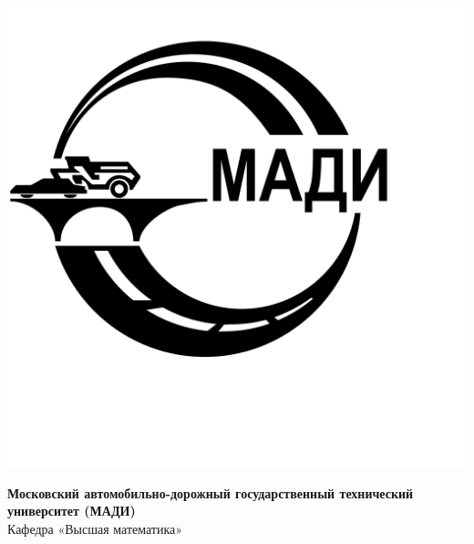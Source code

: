 \documentclass[a4paper,12pt]{article}
\begin{document}
\thispagestyle{empty} %
\titleformat{\section}[block]{\bfseries\large\filcenter}{\thesection}{1em}{}
\titleformat{\subsection}[block]{\bfseries\normalsize}{\thesubsection}{1em}{}
\titleformat{\subsubsection}[block]{\normalsize}{\thesubsubsection}{1em}{}


\noindent
\begin{minipage}{0.15\textwidth}
\includegraphics[width=\linewidth]{madi_logo.png}
\end{minipage}
\hfill
\begin{minipage}{0.85\textwidth}
\begin{center}
\textbf{Московский автомобильно-дорожный государственный технический университет (МАДИ)}\\
Кафедра «Высшая математика»
\end{center}
\end{minipage}
\end{document}
